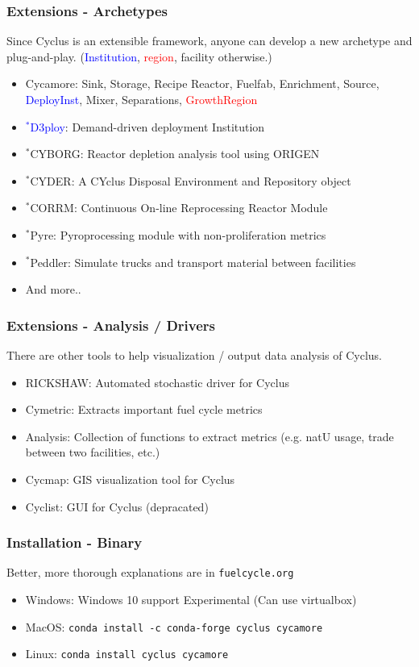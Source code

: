 \begin{frame}
	\frametitle{Extensions - Archetypes}
	Since Cyclus is an extensible framework, anyone can develop a new archetype and plug-and-play. (\textcolor{blue}{Institution}, \textcolor{red}{region}, facility otherwise.)
	\begin{itemize}
		\item Cycamore: Sink, Storage, Recipe Reactor, Fuelfab, Enrichment, Source, \textcolor{blue}{DeployInst}, Mixer, Separations, \textcolor{red}{GrowthRegion} \cite{huff_fundamental_2016}
		\item \textcolor{blue}{$^*$D3ploy}: Demand-driven deployment Institution \cite{noauthor_d3ploy:_2018} 
		\item $^*$CYBORG: Reactor depletion analysis tool using ORIGEN \cite{skutnik_cyborg:_2016}
		\item $^*$CYDER: A CYclus Disposal Environment and Repository object \cite{huff_cyclus_2013}
		\item $^*$CORRM: Continuous On-line Reprocessing Reactor Module \cite{recycle_recycle:_2018}
		\item $^*$Pyre: Pyroprocessing module with non-proliferation metrics \cite{westphal_signatures_2018}
        \item $^*$Peddler: Simulate trucks and transport material between facilities \cite{noauthor_peddler:_2018}
		\item And more..
	\end{itemize}
\end{frame}

\begin{frame}
	\frametitle{Extensions - Analysis / Drivers}
	There are other tools to help visualization / output data analysis of Cyclus.
	\begin{itemize}
		\item RICKSHAW: Automated stochastic driver for Cyclus
		\item Cymetric: Extracts important fuel cycle metrics
		\item Analysis: Collection of functions to extract metrics (e.g. natU usage, trade between two facilities, etc.) 
		\item Cycmap: GIS visualization tool for Cyclus
		\item Cyclist: GUI for Cyclus (depracated)
	\end{itemize}
\end{frame}


\begin{frame}
	\frametitle{Installation - Binary}
	Better, more thorough explanations are in \texttt{fuelcycle.org}
	\begin{itemize}
		\item Windows: Windows 10 support Experimental (Can use virtualbox) 
		\item MacOS: \texttt{conda install -c conda-forge cyclus cycamore}
		\item Linux: \texttt{conda install cyclus cycamore}
	\end{itemize}
\end{frame}


